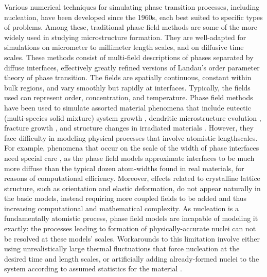 Various numerical techniques for simulating phase transition processes, including nucleation, have been developed since the 1960s, each best suited to specific types of problems. Among these, traditional phase field methods \cites{hohenberg77,singer08,chaikin_condensed,provatas_PFC} are some of the more widely used in studying microstructure formation. They are well-adapted for simulations on micrometer to millimeter length scales, and on diffusive time scales. These methods consist of multi-field descriptions of phases separated by diffuse interfaces, effectively greatly refined versions of Landau's order parameter theory of phase transition. The fields are spatially continuous, constant within bulk regions, and vary smoothly but rapidly at interfaces. Typically, the fields used can represent order, concentration, and temperature. Phase field methods have been used to simulate assorted material phenomena that include eutectic (multi-species solid mixture) system growth \cite{grant94}, dendritic microstructure evolution \cite{provatas98,kim99}, fracture growth \cite{karma01}, and structure changes in irradiated materials \cite{li17}. However, they face difficulty in modeling physical processes that involve atomistic lengthscales. For example, phenomena that occur on the scale of the width of phase interfaces need special care \cite{karma01_2,elder01,plapp11}, as the phase field models approximate interfaces to be much more diffuse than the typical dozen atom-widths found in real materials, for reasons of computational efficiency. Moreover, effects related to crystalline lattice structure, such as orientation and elastic deformation, do not appear naturally in the basic models, instead requiring more coupled fields to be added \cite{oforiopoku2010,steinbach06,granasy_phasefieldnuc,plapp11} and thus increasing computational and mathematical complexity. As nucleation is a fundamentally atomistic process, phase field models are incapable of modeling it exactly: the processes leading to formation of physically-accurate nuclei can not be resolved at these models' scales. Workarounds to this limitation involve either using unrealistically large thermal fluctuations that force nucleation at the desired time and length scales, or artificially adding already-formed nuclei to the system according to assumed statistics for the material \cite{granasy_phasefieldnuc,granasy_02,plapp11}.

